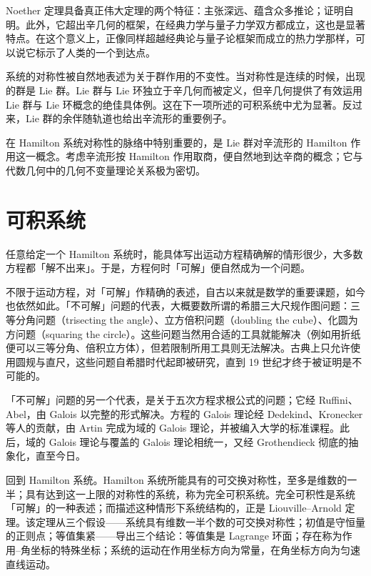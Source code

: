 Noether 定理具备真正伟大定理的两个特征：主张深远、蕴含众多推论；证明自明。此外，它超出辛几何的框架，在经典力学与量子力学双方都成立，这也是显著特点。在这个意义上，正像同样超越经典论与量子论框架而成立的热力学那样，可以说它标示了人类的一个到达点。

系统的对称性被自然地表述为关于群作用的不变性。当对称性是连续的时候，出现的群是 Lie 群。Lie 群与 Lie 环独立于辛几何而被定义，但辛几何提供了有效运用 Lie 群与 Lie 环概念的绝佳具体例。这在下一项所述的可积系统中尤为显著。反过来，Lie 群的余伴随轨道也给出辛流形的重要例子。

在 Hamilton 系统对称性的脉络中特别重要的，是 Lie 群对辛流形的 Hamilton 作用这一概念。考虑辛流形按 Hamilton 作用取商，便自然地到达辛商的概念；它与代数几何中的几何不变量理论关系极为密切。


\section{可积系统}

任意给定一个 Hamilton 系统时，能具体写出运动方程精确解的情形很少，大多数方程都「解不出来」。于是，方程何时「可解」便自然成为一个问题。

不限于运动方程，对「可解」作精确的表述，自古以来就是数学的重要课题，如今也依然如此。「不可解」问题的代表，大概要数所谓的希腊三大尺规作图问题：三等分角问题（trisecting the angle）、立方倍积问题（doubling the cube）、化圆为方问题（squaring the circle）。这些问题当然用合适的工具就能解决（例如用折纸便可以三等分角、倍积立方体），但若限制所用工具则无法解决。古典上只允许使用圆规与直尺，这些问题自希腊时代起即被研究，直到 19 世纪才终于被证明是不可能的。


「不可解」问题的另一个代表，是关于五次方程求根公式的问题；它经 Ruffini、Abel，由 Galois 以完整的形式解决。方程的 Galois 理论经 Dedekind、Kronecker 等人的贡献，由 Artin 完成为域的 Galois 理论，并被编入大学的标准课程。此后，域的 Galois 理论与覆盖的 Galois 理论相统一，又经 Grothendieck 彻底的抽象化，直至今日。

回到 Hamilton 系统。Hamilton 系统所能具有的可交换对称性，至多是维数的一半；具有达到这一上限的对称性的系统，称为完全可积系统。完全可积性是系统「可解」的一种表述；而描述这种情形下系统结构的，正是 Liouville–Arnold 定理。该定理从三个假设——系统具有维数一半个数的可交换对称性；初值是守恒量的正则点；等值集紧——导出三个结论：等值集是 Lagrange 环面；存在称为作用–角坐标的特殊坐标；系统的运动在作用坐标方向为常量，在角坐标方向为匀速直线运动。

